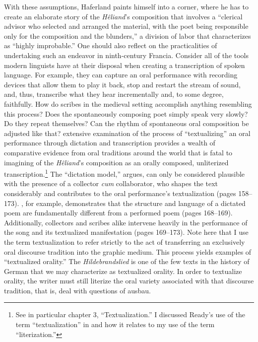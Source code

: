 With these assumptions, Haferland paints himself into a corner, where he has to create an elaborate story of the \textit{Hêliand}’s composition that involves a “clerical advisor who selected and arranged the material, with the poet being responsible only for the composition and the blunders,” a division of labor that \citet[178]{Bostock1976} characterizes as “highly improbable.” One should also reflect on the practicalities of undertaking such an endeavor in ninth-century Francia. Consider all of the tools modern linguists have at their disposal when creating a transcription of spoken language. For example, they can capture an oral performance with recording devices that allow them to play it back, stop and restart the stream of sound, and, thus, transcribe what they hear incrementally and, to some degree, faithfully. How do scribes in the medieval setting accomplish anything resembling this process? Does the spontaneously composing poet simply speak very slowly? Do they repeat themselves? Can the rhythm of spontaneous oral composition be adjusted like that?  extensive examination of the process of “textualizing” an oral performance through dictation and transcription provides a wealth of comparative evidence from oral traditions around the world that is fatal to  imagining of the \textit{Hêliand}’s composition as an orally composed, unliterized transcription.\footnote{See in particular  chapter 3, “Textualization.” I discussed Ready’s use of the term “textualization” in  and how it relates to my use of the term “literization.”} The “dictation model,” \citet{Ready2019} argues, can only be considered plausible with the presence of a collector \textit{cum} collaborator, who shapes the text considerably and contributes to the oral performance’s textualization (pages 158--173). \citet{Ready2019}, for example, demonstrates that the structure and language of a dictated poem are fundamentally different from a performed poem (pages 168--169). Additionally, collectors and scribes alike intervene heavily in the performance of the song and its textualized manifestation (pages 169--173). Note here that I use the term textualization to refer strictly to the act of transferring an exclusively oral discourse tradition into the graphic medium. This process yields examples of “textualized orality.” The \textit{Hildebrandslied} is one of the few texts in the history of German that we may characterize as textualized orality. In order to textualize orality, the writer must still literize the oral variety associated with that discourse tradition, that is, deal with questions of ausbau.

